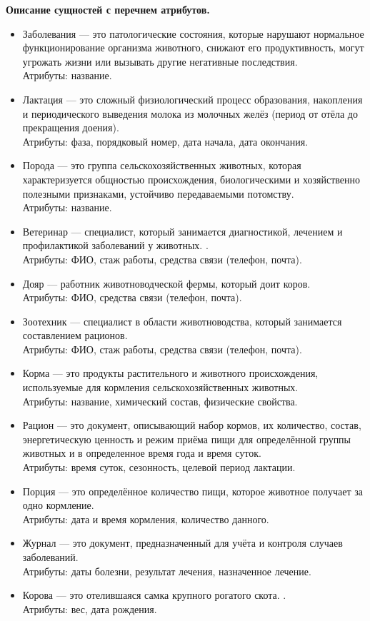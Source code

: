 \textbf{Описание сущностей с перечнем атрибутов.}
\begin{itemize}
    \item Заболевания --- это патологические состояния, которые нарушают нормальное функционирование организма животного, снижают его продуктивность, могут угрожать жизни или вызывать другие негативные последствия.\\
    Атрибуты: название.
    \item Лактация --- это сложный физиологический процесс образования, накопления и периодического выведения молока из молочных желёз (период от отёла до прекращения доения).\\
    Атрибуты: фаза, порядковый номер, дата начала, дата окончания.
    \item Порода ---  это группа сельскохозяйственных животных, которая характеризуется общностью происхождения, биологическими и хозяйственно полезными признаками, устойчиво передаваемыми потомству.\\
    Атрибуты: название.
    \item Ветеринар --- специалист, который занимается диагностикой, лечением и профилактикой заболеваний у животных. .\\
    Атрибуты: ФИО, стаж работы, средства связи (телефон, почта).
    \item Дояр --- работник животноводческой фермы, который доит коров.\\
    Атрибуты: ФИО, средства связи (телефон, почта).
    \item  Зоотехник --- специалист в области животноводства, который занимается составлением рационов.\\
    Атрибуты: ФИО, стаж работы, средства связи (телефон, почта).
    \item Корма ---  это продукты растительного и животного происхождения, используемые для кормления сельскохозяйственных животных.\\
    Атрибуты: название, химический состав, физические свойства.
    \item Рацион --- это документ, описывающий набор кормов, их количество, состав, энергетическую ценность и режим приёма пищи для определённой группы животных и в определенное время года и время суток.\\
    Атрибуты: время суток, сезонность, целевой период лактации.
    \item Порция --- это определённое количество пищи, которое животное получает за одно кормление.\\
    Атрибуты: дата и время кормления, количество данного.
    \item Журнал ---  это документ, предназначенный для учёта и контроля случаев заболеваний.\\
    Атрибуты: даты болезни, результат лечения, назначенное лечение.
    \item Корова ---  это отелившаяся самка крупного рогатого скота. .\\
    Атрибуты: вес, дата рождения.
\end{itemize}
